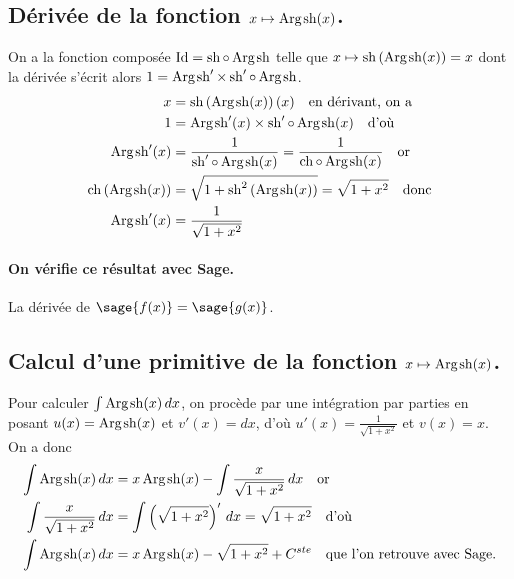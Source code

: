 \documentclass[a4paper,12pt]{report}
\def\Id{\ensuremath{\mathrm{Id}}}
\renewcommand{\sinh}{\mathop{\mathrm{sh}}}
\renewcommand{\cosh}{\mathop{\mathrm{ch}}}
\renewcommand{\arg}{\mathop{\mathrm{Arg}}}
\begin{document}
\subsection{Dérivée de la fonction $x \mapsto \arg\mspace{-1mu}\sinh(x)$.\label{argsinh}}
On a la fonction composée $\Id = \sinh \circ \arg\mspace{-1mu}\sinh$ telle que $x\mapsto\sinh\left(\arg\mspace{-1mu}\sinh(x)\right)=x$ dont la dérivée s'écrit alors $1= \arg\mspace{-1mu}\sinh\nolimits' \times \sinh\nolimits'\circ\arg\mspace{-1mu}\sinh$.
\begin{align*}
x & =\sinh\left(\arg\mspace{-1mu}\sinh(x)\right)(x) \quad \textrm{en dérivant, on a}\\
1 & = \arg\mspace{-1mu}\sinh\nolimits'(x) \times \sinh\nolimits'\circ\arg\mspace{-1mu}\sinh(x) \quad \textrm{d'où}\\
\arg\mspace{-1mu}\sinh\nolimits'(x) & =\frac{1}{ \sinh\nolimits'\circ\arg\mspace{-1mu}\sinh(x)}=\frac{1}{ \cosh \circ \arg\mspace{-1mu}\sinh(x)}\quad \textrm{or}\\
\cosh\left(\arg\mspace{-1mu}\sinh(x)\right) & = \sqrt{1+\sinh\nolimits^2\left(\arg\mspace{-1mu}\sinh(x)\right)}=\sqrt{1+x^2}\quad \textrm{donc}\\
\arg\mspace{-1mu}\sinh\nolimits'(x) & = \frac{1}{ \sqrt{1+x^2}}
\end{align*}


\paragraph{On vérifie ce résultat avec Sage.}
La dérivée de $\sage{f(x)} = \sage{g(x)} $.


\subsection{Calcul d'une primitive de la fonction  $x \mapsto \arg\mspace{-1mu}\sinh(x)$.}
Pour calculer $\int \arg\mspace{-1mu}\sinh(x) \, dx$, on procède par une intégration par parties en posant $u(x) = \arg\mspace{-1mu}\sinh(x)$ et $v'(x) = dx$, d'où $u'(x) = \frac{1}{ \sqrt{1+x^2}}$ et $ v(x) = x $. \\
On a donc
\begin{align*}
\int \arg\mspace{-1mu}\sinh(x) \, dx & = x \arg\mspace{-1mu}\sinh(x) - \int \frac{x}{ \sqrt{1+x^2}} \, dx \quad \textrm{or}\\
\int \frac{x}{ \sqrt{1+x^2}} \, dx & = \int \left(\sqrt{1+x^2}\right)' \, dx = \sqrt{1+x^2}  \quad \textrm{d'où}\\
\int \arg\mspace{-1mu}\sinh(x) \, dx & = x \arg\mspace{-1mu}\sinh(x) - \sqrt{1+x^2} + C^{ste} \quad \textrm{que l'on retrouve avec Sage.}
\end{align*}
\end{document}
